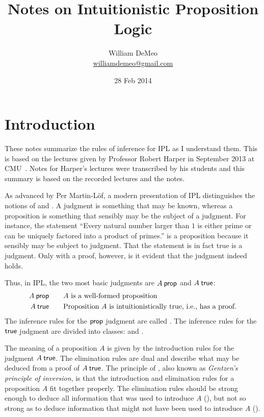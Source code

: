 \documentclass{article}
\title{Notes on Intuitionistic Proposition Logic}
\author{William DeMeo\\
  \url{williamdemeo@gmail.com}}
\date{28 Feb 2014}
\begin{document}

\maketitle

\section{Introduction}
These notes summarize the rules of inference for \ac{IPL} as I understand them.
This is based on the lectures given by Professor Robert Harper in September
2013 at CMU~\cite{Harper2012}. 
Notes for Harper's lectures were transcribed by his students and
this summary is based on the recorded lectures and the notes. 

As advanced by Per Martin-L\"{o}f, a modern presentation of \ac{IPL}
distinguishes the notions of  and . A
judgment is something that may be known, whereas a proposition is something that
sensibly may be the subject of a judgment. For instance, the statement ``Every
natural number larger than $1$ is either prime or can be uniquely factored into
a product of primes\@.'' is a proposition because it sensibly may be subject to
judgment. That the statement is in fact true is a judgment.
Only with a proof, however, is it evident that the judgment indeed holds.

Thus, in \ac{IPL}, the two most basic judgments are $A \prop$ and $A \true$:
\begin{alignat*}{2}
  A \prop &&\quad& \text{$A$ is a well-formed proposition} \\
  A \true &&& \text{\begin{tabular}[t]{@{}l@{}}
                Proposition $A$ is intuitionistically true, i.e., has a proof.
              \end{tabular}}
\end{alignat*}
The inference rules for the $\prop$ judgment are called .
The inference rules for the $\true$ judgment are divided into classes:
 and . 

The meaning of a proposition $A$ is given by the introduction rules for the
judgment $A \true$. The elimination rules are dual and  describe what may be
deduced from a proof of $A \true$.  The principle of ,
also known as \emph{Gentzen's principle of inversion}, is that the introduction
and elimination rules for a proposition $A$ fit together properly.  The
elimination rules should be strong enough to deduce all information that was
used to introduce $A$ (), but not so strong as to
deduce information that might not have been used to introduce $A$ (). 
\end{document}
